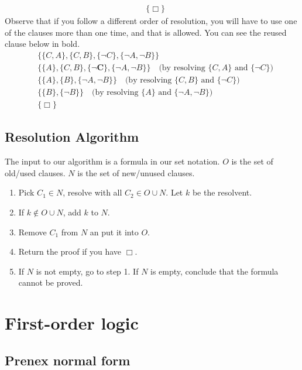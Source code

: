 \documentclass[10pt]{article}
\newenvironment{solution}[1][\emph{Solution:}]{\begin{trivlist}
\item[\hskip \labelsep {\bfseries #1}]}{\end{trivlist}}
\newcommand{\set}[1]{\{#1\}}
\begin{document}
\begin{solution}
\begin{align*}
& \set{\Box}
\end{align*}\newpage
Observe that if you follow a different order of resolution, you will have to use one of the clauses more than one time, and that is allowed. You can see the reused clause below in bold.
\begin{align*}
& \set{\set{C,A}, \set{C,B}, \set{\lnot C}, \set{\lnot A, \lnot B}}\\
& \set{\set{A}, \set{C,B}, \mathbf{\set{\lnot C}}, \set{\lnot A, \lnot B}}  \quad\text{(by resolving $\set{C,A}$ and $\set{\lnot C}$)}\\
& \set{\set{A}, \set{B}, \set{\lnot A, \lnot B}}  \quad\text{(by resolving $\set{C,B}$ and $\set{\lnot C}$)}\\
& \set{\set{B}, \set{\lnot B}}  \quad\text{(by resolving $\set{A}$ and $\set{\lnot A, \lnot B}$)}\\
& \set{\Box}
\end{align*}
\end{solution}

\subsection{Resolution Algorithm}

The input to our algorithm is a formula in our set notation.
$O$ is the set of old/used clauses.
$N$ is the set of new/unused clauses.

\begin{enumerate}
\item Pick $C_1 \in N$, resolve with all $C_2 \in O \cup N$. Let $k$ be the resolvent.
\item If $k \notin O \cup N$, add $k$ to $N$.
\item Remove $C_1$ from $N$ an put it into $O$.
\item Return the proof if you have $\Box$.
\item If $N$ is not empty, go to step 1. If $N$ is empty, conclude that the formula cannot be proved.
\end{enumerate}

\section{First-order logic}

\subsection{Prenex normal form}
\end{document}
